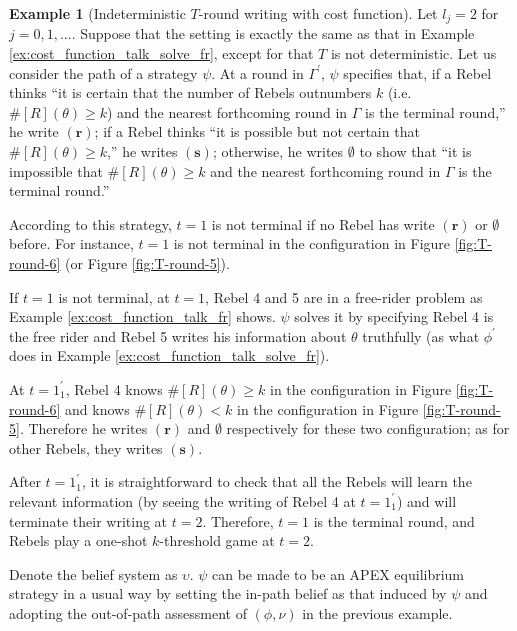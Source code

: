\documentclass[12pt,letter]{article}
\theoremstyle{definition}
\newtheorem{example}{Example}
\theoremstyle{remark}
\theoremstyle{claim}
\begin{document}
\begin{example}[Indeterministic $T$-round writing with cost function]
\label{ex:cost_function_talk_solve_fr_Indm}
Let $l_j=2$ for $j=0,1,...$. Suppose that the setting is exactly the same as that in Example \ref{ex:cost_function_talk_solve_fr}, except for that $T$ is not deterministic. Let us consider the path of a strategy $\psi$. At a round in $\Gamma^{'}$, $\psi$ specifies that, if a Rebel thinks ``it is certain that the number of Rebels outnumbers $k$ (i.e.~$\# [R](\theta)\geq k$) and the nearest forthcoming round in $\Gamma$ is the terminal round,'' he write $(\textbf{r})$; if a Rebel thinks ``it is possible but not certain that $\# [R](\theta)\geq k$,'' he writes $(\textbf{s})$; otherwise, he writes $\emptyset$ to show that ``it is impossible that $\#[R](\theta)\geq k$ and the nearest forthcoming round in $\Gamma$ is the terminal round.'' 

According to this strategy, $t=1$ is not terminal if no Rebel has write $(\textbf{r})$ or $\emptyset$ before. For instance, $t=1$ is not terminal in the configuration in Figure \ref{fig:T-round-6} (or Figure \ref{fig:T-round-5}). 

If $t=1$ is not terminal, at $t=1$, Rebel 4 and 5 are in a free-rider problem as Example \ref{ex:cost_function_talk_fr} shows. $\psi$ solves it by specifying Rebel 4 is the free rider and Rebel 5 writes his information about $\theta$ truthfully (as what $\phi^{'}$ does in Example \ref{ex:cost_function_talk_solve_fr}). 

At $t=1^{'}_1$, Rebel 4 knows $\#[R](\theta)\geq k$ in the configuration in Figure \ref{fig:T-round-6} and knows $\#[R](\theta)< k$ in the configuration in Figure \ref{fig:T-round-5}. Therefore he writes $(\textbf{r})$ and $\emptyset$ respectively for these two configuration; as for other Rebels, they writes $(\textbf{s})$. 

After $t=1^{'}_1$, it is straightforward to check that all the Rebels will learn the relevant information (by seeing the writing of Rebel 4 at $t=1^{'}_1$) and will terminate their writing at $t=2$. Therefore, $t=1$ is the terminal round, and Rebels play a one-shot $k$-threshold game at $t=2$.

Denote the belief system as $\upsilon$. $\psi$ can be made to be an APEX equilibrium strategy in a usual way by setting the in-path belief as that induced by $\psi$ and adopting the out-of-path assessment of $(\phi,\nu)$ in the previous example.
\end{example}
\end{document}
